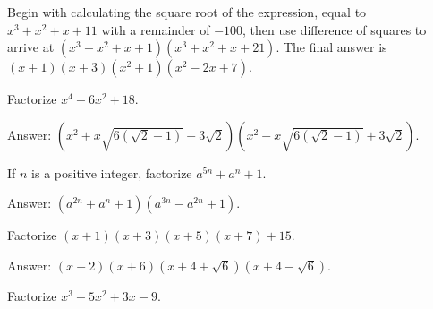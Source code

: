 \documentclass[12pt,a4paper]{memoir}
\theoremstyle{definition}
\begin{document}
\begin{solution}[name=Solution by Parviz Shahriari]
	Begin with calculating the square root of the expression, equal to $x^3+x^2+x+11$ with a remainder of $-100$, then use difference of squares to arrive at $(x^3+x^2+x+1)(x^3+x^2+x+21)$. The final answer is $(x+1)(x+3)(x^2+1)(x^2-2x+7)$.
\end{solution}


\begin{tcolorbox}
	\begin{question}
		Factorize $x^4+6x^2+18$.
	\end{question}
\end{tcolorbox}

\begin{solution}[name=Solution by Parviz Shahriari]
	Answer: $(x^2+x\sqrt{6(\sqrt{2}-1)}+3\sqrt{2})(x^2-x\sqrt{6(\sqrt{2}-1)}+3\sqrt{2})$.
\end{solution}




\begin{tcolorbox}
	\begin{question}
		If $n$ is a positive integer, factorize $a^{5n}+a^n+1$.
	\end{question}
\end{tcolorbox}

\begin{solution}[name=Solution by Parviz Shahriari]
	Answer: $(a^{2n}+a^n+1)(a^{3n}-a^{2n}+1)$.
\end{solution}




\begin{tcolorbox}
	\begin{question}
		Factorize $(x+1)(x+3)(x+5)(x+7)+15$.
	\end{question}
\end{tcolorbox}

\begin{solution}[name=Solution by Parviz Shahriari]
	Answer: $(x+2)(x+6)(x+4+\sqrt{6})(x+4-\sqrt{6})$.
\end{solution}

\begin{tcolorbox}
	\begin{question}
		Factorize $x^3+5x^2+3x-9$.
	\end{question}
\end{tcolorbox}
\end{document}
